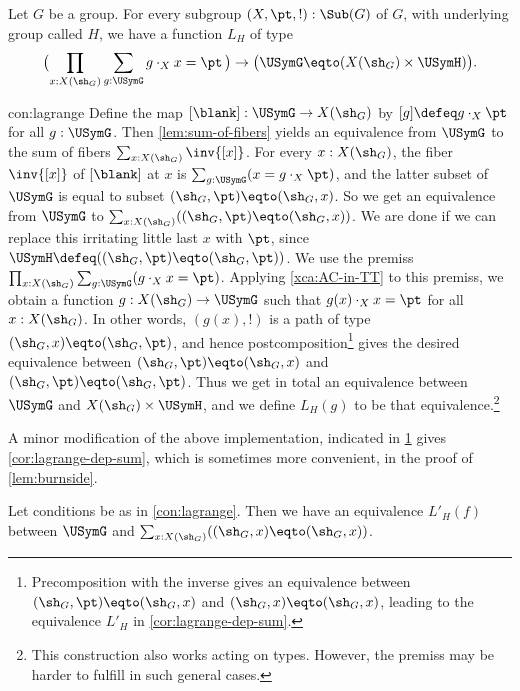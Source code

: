 \begin{construction}\label{con:lagrange}
Let $G$ be a group. For every subgroup $(X,\pt,!):\Sub(G)$ of $G$,
with underlying group called $H$, we have a function $L_H$ of type
\[
\bigl(\prod_{x:X(\sh_G)}\sum_{g:\USymG} g\cdot_X x = \pt \,\bigr) \to
\bigl(\USymG \eqto (X(\sh_G) \times \USymH)\bigr).
\]
\end{construction}

\begin{implementation}{con:lagrange}
Define the map $[\blank] : \USymG \to X(\sh_G)$ by $[g]\defeq g\cdot_X \pt$
for all $g:\USymG$. Then \cref{lem:sum-of-fibers} yields an
equivalence from $\USymG$ to the sum of fibers
$\sum_{x:X(\sh_G)}\inv{[x]}$.
For every $x:X(\sh_G)$, the fiber $\inv{[x]}$ of $[\blank]$ at $x$ is 
$\sum_{g:\USymG} (x = g\cdot_X \pt)$, and the latter subset
of $\USymG$ is equal to subset $(\sh_G,\pt)\eqto(\sh_G,x)$.
So we get an equivalence from $\USymG$ to 
$\sum_{x:X(\sh_G)}((\sh_G,\pt)\eqto(\sh_G,x))$. We are done if
we can replace this irritating little last $x$ with $\pt$, since
$\USymH\defeq((\sh_G,\pt)\eqto(\sh_G,\pt))$.
We use the premiss 
$\prod_{x:X(\sh_G)}\sum_{g:\USymG} (g\cdot_X x = \pt)$.
Applying \cref{xca:AC-in-TT} to this premiss, we obtain
a function $g:X(\sh_G)\to\USymG$ such that $g(x)\cdot_X x = \pt$
for all $x:X(\sh_G)$. In other words, $(g(x),!)$ is a path of type
$(\sh_G,x)\eqto(\sh_G,\pt)$, and hence postcomposition\footnote{%
\label{ft:lagrange-dep-sum}
Precomposition with the inverse gives an equivalence between
$(\sh_G,\pt)\eqto(\sh_G,x)$ and $(\sh_G,x)\eqto(\sh_G,x)$,
leading to the equivalence $L'_H$ in \cref{cor:lagrange-dep-sum}.}
gives the desired equivalence between $(\sh_G,\pt)\eqto(\sh_G,x)$ and 
$(\sh_G,\pt)\eqto(\sh_G,\pt)$. Thus we get in total an equivalence  
between $\USymG$ and $X(\sh_G) \times \USymH$, and we define $L_H(g)$
to be that equivalence.\footnote{This construction also works 
\inftygps acting on types. However, the premiss may be harder to
fulfill in such general cases.}
\end{implementation}

A minor modification of the above implementation,
indicated in \cref{ft:lagrange-dep-sum} gives \cref{cor:lagrange-dep-sum}, 
which is sometimes more convenient, \eg in the proof of \cref{lem:burnside}.

\begin{construction}\label{cor:lagrange-dep-sum}
Let conditions be as in \cref{con:lagrange}. Then
we have an equivalence $L'_H(f)$ between $\USymG$ and
$\sum_{x:X(\sh_G)}((\sh_G,x)\eqto(\sh_G,x))$.
\end{construction}

